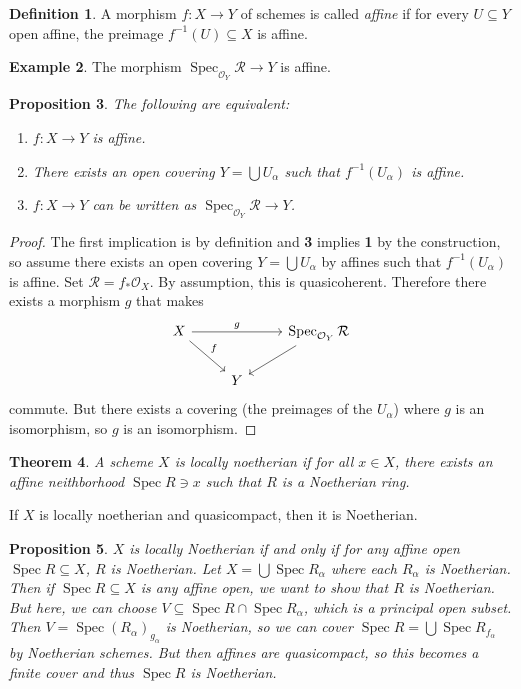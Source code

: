 \documentclass[leqno, openany]{memoir}
\newtheorem{thm}{Theorem}[section]
\newtheorem{prop}[thm]{Proposition}
\theoremstyle{definition}
\newtheorem{defn}[thm]{Definition}
\newtheorem{exm}[thm]{Example}
\theoremstyle{remark}
\theoremstyle{plain}
\theoremstyle{definition}
\theoremstyle{remark}
\newcommand{\mc}[1]{\mathcal{#1}}
\DeclareMathOperator{\Spec}{Spec}
\begin{document}
\begin{defn}
    A morphism $f \colon X \to Y$ of schemes is called \textit{affine} if for every $U \subseteq Y$ open affine, the preimage $f^{-1}(U) \subseteq X$ is affine. 
\end{defn}

\begin{exm}
    The morphism $\Spec_{\mc{O}_Y} \mc{R} \to Y$ is affine.
\end{exm}

\begin{prop}
    The following are equivalent:
    \begin{enumerate}
        \item $f \colon X \to Y$ is affine.
        \item There exists an open covering $Y = \bigcup U_{\alpha}$ such that $f^{-1}(U_{\alpha})$ is affine.
        \item $f \colon X \to Y$ can be written as $\Spec_{\mc{O}_Y} \mc{R} \to Y$.
    \end{enumerate}
\end{prop}

\begin{proof}
    The first implication is by definition and \textbf{3} implies \textbf{1} by the construction, so assume there exists an open covering $Y = \bigcup U_{\alpha}$ by affines such that $f^{-1}(U_{\alpha})$ is affine. Set $\mc{R} = f_* \mc{O}_X$. By assumption, this is quasicoherent. Therefore there exists a morphism $g$ that makes
    \begin{equation*}
    \begin{tikzcd}
        X \arrow{rr}{g} \arrow{dr}{f} & & \Spec_{\mc{O}_Y} \mc{R} \arrow{dl} \\
                                      & Y
    \end{tikzcd}
    \end{equation*}
    commute. But there exists a covering (the preimages of the $U_{\alpha}$) where $g$ is an isomorphism, so $g$ is an isomorphism.
\end{proof}

\begin{thm}
    A scheme $X$ is \textit{locally noetherian} if for all $x \in X$, there exists an affine neithborhood $\Spec R \ni x$ such that $R$ is a Noetherian ring. 
\end{thm}

If $X$ is locally noetherian and quasicompact, then it is Noetherian.

\begin{prop}
    $X$ is locally Noetherian if and only if for any affine open $\Spec R \subseteq X$, $R$ is Noetherian. Let $X = \bigcup \Spec R_{\alpha}$ where each $R_{\alpha}$ is Noetherian. Then if $\Spec R \subseteq X$ is any affine open, we want to show that $R$ is Noetherian. But here, we can choose $V \subseteq \Spec R \cap \Spec R_{\alpha}$, which is a principal open subset. Then $V = \Spec { (R_{\alpha}) }_{g_{\alpha}}$ is Noetherian, so we can cover $\Spec R = \bigcup \Spec R_{f_{\alpha}}$ by Noetherian schemes. But then affines are quasicompact, so this becomes a finite cover and thus $\Spec R$ is Noetherian.
\end{prop}
\end{document}
